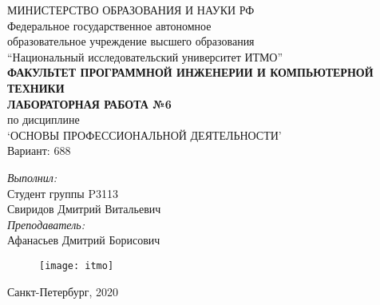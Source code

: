 \begin{center}
МИНИСТЕРСТВО ОБРАЗОВАНИЯ И НАУКИ РФ\\
\hfill \break
Федеральное государственное автономное\\ 
образовательное учреждение высшего образования\\
``Национальный исследовательский университет ИТМО''\\
\hfill \break
\textbf{ФАКУЛЬТЕТ ПРОГРАММНОЙ ИНЖЕНЕРИИ И КОМПЬЮТЕРНОЙ ТЕХНИКИ}\\
\vspace{2.5cm}
\large{\textbf{ЛАБОРАТОРНАЯ РАБОТА №6}}\\
по дисциплине\\
\large{`ОСНОВЫ ПРОФЕССИОНАЛЬНОЙ ДЕЯТЕЛЬНОСТИ'}\\
\hfill \break
Вариант: 688\\
\end{center}

\vspace{8cm}
 
\begin{flushright}
\textit{Выполнил:}\\
Студент группы P3113\\
Свиридов Дмитрий Витальевич\\
\textit{Преподаватель:}\\
Афанасьев Дмитрий Борисович\\
\end{flushright}
 
\vfill

\begin{figure}[H]
\centering
\texttt{[image: itmo]}
\end{figure}
\begin{center} Санкт-Петербург, 2020 \end{center}

\thispagestyle{empty}
\newpage
